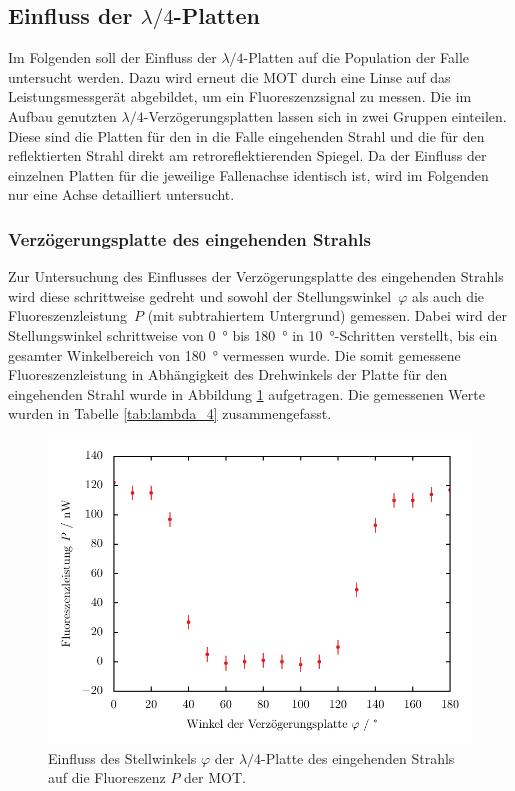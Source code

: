 \documentclass[11pt, a4paper]{article}
\numberwithin{equation}{section}
\begin{document}
\subsection{Einfluss der $\lambda / 4$-Platten}
Im Folgenden soll der Einfluss der $\lambda / 4$-Platten auf die Population der Falle untersucht werden.
Dazu wird erneut die MOT durch eine Linse auf das Leistungsmessgerät abgebildet, um ein Fluoreszenzsignal zu messen.
Die im Aufbau genutzten $\lambda / 4$-Verzögerungsplatten lassen sich in zwei Gruppen einteilen.
Diese sind die Platten für den in die Falle eingehenden Strahl und die für den reflektierten Strahl direkt am retroreflektierenden Spiegel.
Da der Einfluss der einzelnen Platten für die jeweilige Fallenachse identisch ist, wird im Folgenden nur eine Achse detailliert untersucht.

\subsubsection{Verzögerungsplatte des eingehenden Strahls}
\label{sec:lambda_4_inc}
Zur Untersuchung des Einflusses der Verzögerungsplatte des eingehenden Strahls wird diese schrittweise gedreht und sowohl der Stellungswinkel~$\varphi$ als auch die Fluoreszenzleistung~$P$ (mit subtrahiertem Untergrund) gemessen.
Dabei wird der Stellungswinkel schrittweise von \SI{0}{\degree} bis \SI{180}{\degree} in \SI{10}{\degree}-Schritten verstellt, bis ein gesamter Winkelbereich von \SI{180}{\degree} vermessen wurde.
Die somit gemessene Fluoreszenzleistung in Abhängigkeit des Drehwinkels der Platte für den eingehenden Strahl wurde in Abbildung \ref{fig:lambda_4_inc} aufgetragen.
Die gemessenen Werte wurden in Tabelle \ref{tab:lambda_4} zusammengefasst.
\begin{figure}[h]
	\centering
	\includegraphics{./figures/lambda_4_in.pdf}
	\caption{Einfluss des Stellwinkels $\varphi$ der $\lambda / 4$-Platte des eingehenden Strahls auf die Fluoreszenz $P$ der MOT.}
	\label{fig:lambda_4_inc}
\end{figure}
\end{document}
